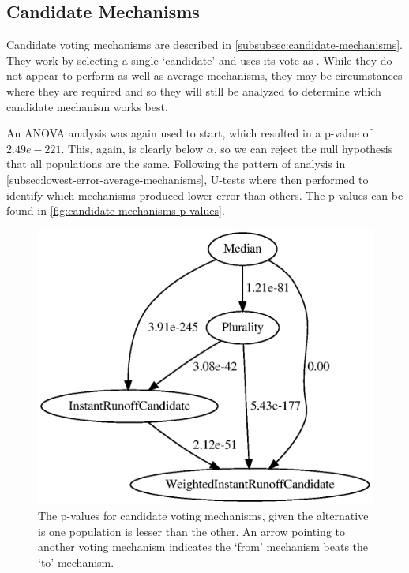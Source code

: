 \subsection{Candidate Mechanisms}\label{subsec:lowest-error-candidate-mechanisms}
Candidate voting mechanisms are described in \autoref{subsubsec:candidate-mechanisms}.
They work by selecting a single `candidate' and uses its vote as \systemtruth.
While they do not appear to perform as well as average mechanisms, they may be
circumstances where they are required and so they will still be analyzed to determine
which candidate mechanism works best.

An ANOVA analysis was again used to start, which resulted in a p-value of
$2.49e-221$.
This, again, is clearly below $\alpha$, so we can reject the null hypothesis that all
populations are the same.
Following the pattern of analysis in
\autoref{subsec:lowest-error-average-mechanisms}, U-tests where then performed to
identify which mechanisms produced lower error than others.
The p-values can be found in \autoref{fig:candidate-mechanisms-p-values}.

\begin{figure}[htbp]
    \centering
    \includegraphics[scale=0.75]
    {./content/figures/candidate-mechanisms-p-values.gv}
    \caption{The p-values for candidate voting mechanisms, given the alternative is one
    population is lesser than the other.
    An arrow pointing to another voting mechanism indicates the `from' mechanism
    beats the `to' mechanism.}
    \label{fig:candidate-mechanisms-p-values}
\end{figure}


